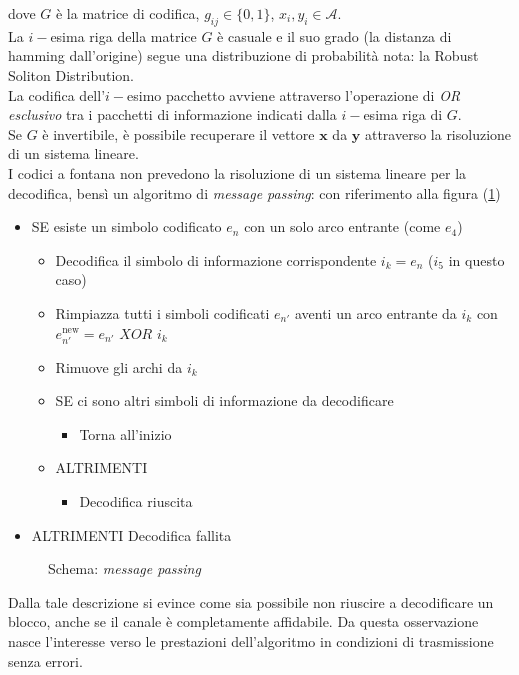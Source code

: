 \documentclass[italian, a4paper, 12pt]{article}
\begin{document}
dove $G$ è la matrice di codifica, $g_{ij}\in\{0,1\}$, $x_i, y_i\in\mathcal{A}$.\\
La $i-$esima riga della matrice $G$ è casuale e il suo grado (la distanza di hamming dall'origine) segue una distribuzione di probabilità nota: la Robust Soliton Distribution.\\
La codifica dell'$i-$esimo pacchetto avviene attraverso l'operazione di \textit{OR esclusivo} tra i pacchetti di informazione indicati dalla $i-$esima riga di $G$.\\
Se $G$ è invertibile, è possibile recuperare il vettore $\bm{x}$ da $\bm{y}$ attraverso la risoluzione di un sistema lineare.\\
I codici a fontana non prevedono la risoluzione di un sistema lineare per la decodifica, bensì un algoritmo di \textit{message passing}: con riferimento alla figura (\ref{fig:FC})
\begin{itemize}
        \item SE esiste un simbolo codificato $e_n$ con un solo arco entrante (come $e_4$)\begin{itemize}
                \item	Decodifica il simbolo di informazione corrispondente $i_k=e_n$ ($i_5$ in questo caso)
                \item	Rimpiazza tutti i simboli codificati $e_{n'}$ aventi un arco entrante da $i_k$ con $e_{n'}^{\text{new}} = e_{n'} \textit{ XOR } i_k$
                \item   Rimuove gli archi da $i_k$
                \item   SE ci sono altri simboli di informazione da decodificare \begin{itemize}
                        \item Torna all'inizio
                \end{itemize}
                \item ALTRIMENTI\begin{itemize}
                        \item Decodifica riuscita
                \end{itemize}
        \end{itemize}

        \item ALTRIMENTI Decodifica fallita
\end{itemize}
\begin{figure}[H]
    \centering
    \caption{Schema: \textit{message passing}}
    \label{fig:FC}
\end{figure}
Dalla tale descrizione si evince come sia possibile non riuscire a decodificare un blocco, anche se il canale è completamente affidabile. Da questa osservazione nasce l'interesse verso le prestazioni dell'algoritmo in condizioni di trasmissione senza errori.
\newpage
\end{document}
